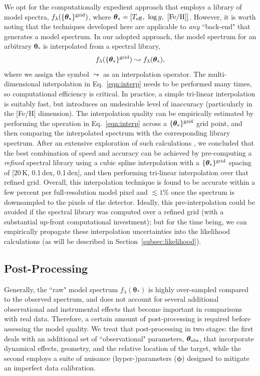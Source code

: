 \documentclass[iop,floatfix]{emulateapj}
\newcommand{\flam}{f_\lambda}
\newcommand{\vt}{ {\bm \theta}}
\newcommand{\vp}{ {\bm \phi}}
\begin{document}
We opt for the computationally expedient approach that employs a library of
model spectra, $\flam(\{\vt_{\ast}\}^{\rm grid})$, where $\vt_{\ast} = [T_{\rm
eff}, \,\, \log{g}, \,\, [{\rm Fe/H}]]$.  However, it is worth noting that the
techniques developed here are applicable to {\it any} ``back-end" that
generates a model spectrum.  In our adopted approach, the model spectrum for an
arbitrary $\vt_{\ast}$ is interpolated from a spectral library,
\begin{equation} \label{eqn:interp} \flam(\{\vt_{\ast}\}^{\rm grid}) \leadsto
\flam(\vt_{\ast}), \end{equation} where we assign the symbol $\leadsto$ as an
interpolation operator.  The multi-dimensional interpolation in
Eq.~\ref{eqn:interp} needs to be performed many times, so computational
efficiency is critical.  In practice, a simple tri-linear interpolation is
suitably fast, but introduces an undesirable level of inaccuracy
(particularly in the [Fe/H] dimension).  The interpolation quality can be
empirically estimated by performing the operation in Eq.~\ref{eqn:interp}
across a $\{\vt_{\ast}\}^{\rm grid}$ grid point, and then comparing the
interpolated spectrum with the corresponding library spectrum. After an
extensive exploration of such calculations \citep[see also][]{husser12}, we
concluded that the best combination of speed and accuracy can be achieved by
pre-computing a {\it refined} spectral library using a cubic spline
interpolation with a $\{\vt_{\ast}\}^{\rm grid}$ spacing of [20\,K, 0.1\,dex,
0.1\,dex], and then performing tri-linear interpolation over that refined
grid.  Overall, this interpolation technique is found to be accurate within
a few percent per full-resolution model pixel and $\lesssim 1$\% once the
spectrum is downsampled to the pixels of the detector.  Ideally, this
pre-interpolation could be avoided if the spectral library was computed
over a refined grid (with a substantial up-front computational investment);
but for the time being, we can empirically propagate these interpolation
uncertainties into the likelihood calculations (as will be described in
Section~\ref{subsec:likelihood}).

\subsection{Post-Processing} \label{subsec:postprocess}

Generally, the ``raw" model spectrum $\flam(\vt_{\ast})$ is highly over-sampled compared to the 
observed spectrum, and does not account for several additional observational and 
instrumental effects that become important in comparisons with real data.  Therefore, a certain 
amount of post-processing is required before assessing the model quality.  We treat that 
post-processing in two stages: the first deals with an additional set of ``observational" 
parameters, $\vt_{\rm obs}$, that incorporate dynamical effects, geometry, and the relative 
location of the target, while the second employs a suite of nuisance (hyper-)parameters ($\vp$) 
designed to mitigate an imperfect data calibration.
\end{document}
